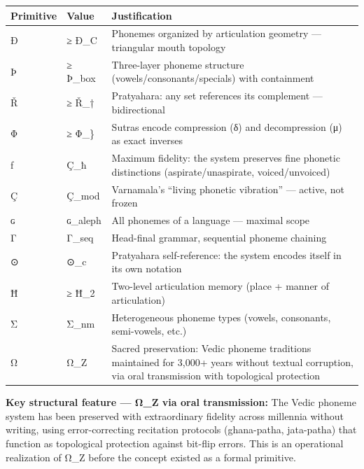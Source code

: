 {\def\LTcaptype{none} %
\begin{longtable}[]{@{}
  >{\raggedright\arraybackslash}p{}
  >{\raggedright\arraybackslash}p{}
  >{\raggedright\arraybackslash}p{}@{}}
\toprule\noalign{}
\begin{minipage}[b]{\linewidth}\raggedright
Primitive
\end{minipage} & \begin{minipage}[b]{\linewidth}\raggedright
Value
\end{minipage} & \begin{minipage}[b]{\linewidth}\raggedright
Justification
\end{minipage} \\
\midrule\noalign{}
\endhead
\bottomrule\noalign{}
\endlastfoot
Ð & ≥ Ð\_C & Phonemes organized by articulation geometry --- triangular
mouth topology \\
Þ & ≥ Þ\_box & Three-layer phoneme structure
(vowels/consonants/specials) with containment \\
Ř & ≥ Ř\_† & Pratyahara: any set references its complement ---
bidirectional \\
Φ & ≥ Φ\_\} & Sutras encode compression (δ) and decompression (μ) as
exact inverses \\
ƒ & Ç\_ħ & Maximum fidelity: the system preserves fine phonetic
distinctions (aspirate/unaspirate, voiced/unvoiced) \\
Ç & Ç\_mod & Varnamala's ``living phonetic vibration'' --- active, not
frozen \\
ɢ & ɢ\_aleph & All phonemes of a language --- maximal scope \\
Γ & Γ\_seq & Head-final grammar, sequential phoneme chaining \\
⊙ & ⊙\_c & Pratyahara self-reference: the system encodes itself in its
own notation \\
Ħ & ≥ Ħ\_2 & Two-level articulation memory (place + manner of
articulation) \\
Σ & Σ\_nm & Heterogeneous phoneme types (vowels, consonants,
semi-vowels, etc.) \\
Ω & Ω\_Z & Sacred preservation: Vedic phoneme traditions maintained for
3,000+ years without textual corruption, via oral transmission with
topological protection \\
\end{longtable}
}

\textbf{Key structural feature --- Ω\_Z via oral transmission:} The
Vedic phoneme system has been preserved with extraordinary fidelity
across millennia without writing, using error-correcting recitation
protocols (ghana-patha, jata-patha) that function as topological
protection against bit-flip errors. This is an operational realization
of Ω\_Z before the concept existed as a formal primitive.

